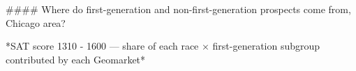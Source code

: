 #### Where do first-generation and non-first-generation prospects come from, Chicago area?

*SAT score 1310 - 1600 — share of each race × first-generation subgroup contributed by each Geomarket*
